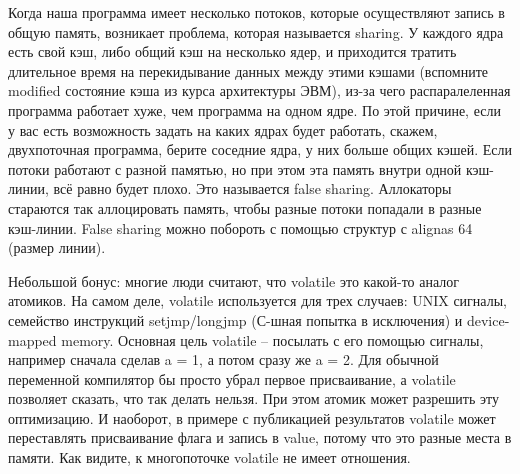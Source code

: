 \documentclass[12pt, a4paper]{article}
\begin{document}
\par Когда наша программа имеет несколько потоков, которые осуществляют запись в общую память, возникает проблема, которая называется sharing. У каждого ядра есть свой кэш, либо общий кэш на несколько ядер, и приходится тратить длительное время на перекидывание данных между этими кэшами (вспомните modified состояние кэша из курса архитектуры ЭВМ), из-за чего распаралеленная программа работает хуже, чем программа на одном ядре. По этой причине, если у вас есть возможность задать на каких ядрах будет работать, скажем, двухпоточная программа, берите соседние ядра, у них больше общих кэшей. Если потоки работают с разной памятью, но при этом эта память внутри одной кэш-линии, всё равно будет плохо. Это называется false sharing. Аллокаторы стараются так аллоцировать память, чтобы разные потоки попадали в разные кэш-линии. False sharing можно побороть с помощью структур с alignas 64 (размер линии).\\
\par Небольшой бонус: многие люди считают, что volatile это какой-то аналог атомиков. На самом деле, volatile используется для трех случаев: UNIX сигналы, семейство инструкций setjmp/longjmp (С-шная попытка в исключения) и device-mapped memory. Основная цель volatile -- посылать с его помощью сигналы, например сначала сделав a = 1, а потом сразу же a = 2. Для обычной переменной компилятор бы просто убрал первое присваивание, а volatile позволяет сказать, что так делать нельзя. При этом атомик может разрешить эту оптимизацию. И наоборот, в примере с публикацией результатов volatile может переставлять присваивание флага и запись в value, потому что это разные места в памяти. Как видите, к многопоточке volatile не имеет отношения.
\end{document}
